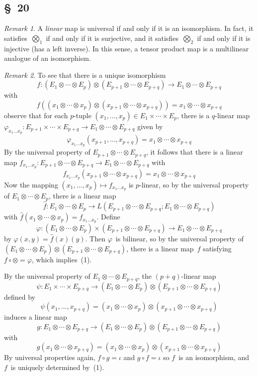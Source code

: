 \documentclass[letterpaper,12pt]{article}
\newcommand{\after}{\circ}
\newcommand{\cross}{\times}
\newcommand{\tprod}{\otimes}
\newcommand{\bigtprod}{\bigotimes}
\newcommand{\medtprod}{{\textstyle\bigtprod}}
\newcommand{\multi}[4]{#2_{#3}#1\cdots#1#2_{#4}}
\newcommand{\timess}[3]{\multi{\cross}{#1}{#2}{#3}}
\newcommand{\tprods}[3]{\multi{\tprod}{#1}{#2}{#3}}
\theoremstyle{definition}
\theoremstyle{remark}
\newtheorem*{rmk}{Remark}
\begin{document}
\subsection*{\S~20}
\begin{rmk}
A \emph{linear} map is universal if and only if it is an isomorphism. In fact, it satisfies~\(\medtprod_1\) if and only if it is surjective, and it satisfies~\(\medtprod_2\) if and only if it is injective (has a left inverse). In this sense, a tensor product map is a multilinear analogue of an isomorphism.
\end{rmk}

\begin{rmk}
To see that there is a unique isomorphism
\[f:(\tprods{E}{1}{p})\tprod(\tprods{E}{p+1}{p+q})\to\tprods{E}{1}{p+q}\]
with
\[f((\tprods{x}{1}{p})\tprod(\tprods{x}{p+1}{p+q}))=\tprods{x}{1}{p+q}\tag{1}\]
observe that for each \(p\)-tuple \((x_1,\ldots,x_p)\in\timess{E}{1}{p}\), there is a \(q\)-linear map \(\varphi_{x_1\ldots x_p}:\timess{E}{p+1}{p+q}\to\tprods{E}{1}{p+q}\) given by
\[\varphi_{x_1\ldots x_p}(x_{p+1},\ldots,x_{p+q})=\tprods{x}{1}{p+q}\]
By the universal property of \(\tprods{E}{p+1}{p+q}\), it follows that there is a linear map \(f_{x_1\ldots x_p}:\tprods{E}{p+1}{p+q}\to\tprods{E}{1}{p+q}\) with
\[f_{x_1\ldots x_p}(\tprods{x}{p+1}{p+q})=\tprods{x}{1}{p+q}\]
Now the mapping \((x_1,\ldots,x_p)\mapsto f_{x_1\ldots x_p}\) is \(p\)-linear, so by the universal property of \(\tprods{E}{1}{p}\), there is a linear map
\[\widehat{f}:\tprods{E}{1}{p}\to L(\tprods{E}{p+1}{p+q};\tprods{E}{1}{p+q})\]
with \(\widehat{f}(\tprods{x}{1}{p})=f_{x_1\ldots x_p}\). Define
\[\varphi:(\tprods{E}{1}{p})\times(\tprods{E}{p+1}{p+q})\to\tprods{E}{1}{p+q}\]
by \(\varphi(x,y)=\widehat{f}(x)(y)\). Then \(\varphi\)~is bilinear, so by the universal property of \((\tprods{E}{1}{p})\tprod(\tprods{E}{p+1}{p+q})\), there is a linear map~\(f\) satisfying \(f\after\tprod=\varphi\), which implies~(1).

By the universal property of \(\tprods{E}{1}{p+q}\), the \((p+q)\)-linear map
\[\psi:\timess{E}{1}{p+q}\to(\tprods{E}{1}{p})\tprod(\tprods{E}{p+1}{p+q})\]
defined by
\[\psi(x_1,\ldots,x_{p+q})=(\tprods{x}{1}{p})\tprod(\tprods{x}{p+1}{p+q})\]
induces a linear map
\[g:\tprods{E}{1}{p+q}\to(\tprods{E}{1}{p})\tprod(\tprods{E}{p+1}{p+q})\]
with
\[g(\tprods{x}{1}{p+q})=(\tprods{x}{1}{p})\tprod(\tprods{x}{p+1}{p+q})\]
By universal properties again, \(f\after g=\iota\) and \(g\after f=\iota\) so \(f\)~is an isomorphism, and \(f\)~is uniquely determined by~(1).
\end{rmk}
\end{document}
